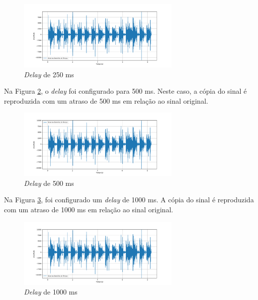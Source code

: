 \begin{figure}[h]
	\centering
    \includegraphics[width=0.7\textwidth]{figuras/fig75.png}
	\caption{\textit{Delay} de 250 ms}
	\label{fig75}
\end{figure}

Na Figura \ref{fig76}, o \textit{delay} foi configurado para 500 ms. Neste caso, a cópia do sinal é reproduzida com um atraso de 500 ms em relação ao sinal original.

\begin{figure}[h]
	\centering
    \includegraphics[width=0.7\textwidth]{figuras/fig76.png}
	\caption{\textit{Delay} de 500 ms}
	\label{fig76}
\end{figure}

Na Figura \ref{fig77}, foi configurado um \textit{delay} de 1000 ms. A cópia do sinal é reproduzida com um atraso de 1000 ms em relação ao sinal original.

\begin{figure}[h]
	\centering
    \includegraphics[width=0.7\textwidth]{figuras/fig77.png}
	\caption{\textit{Delay} de 1000 ms}
	\label{fig77}
\end{figure}
